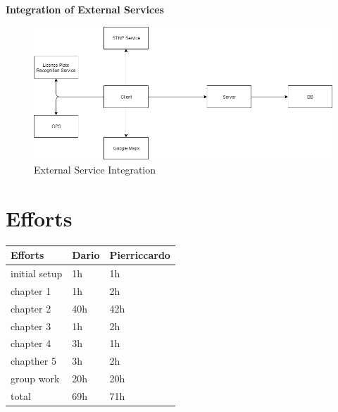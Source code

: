 \documentclass{article}
\begin{document}
\textbf{Integration of External Services}
\begin{figure}[H]
    \centering
    \includegraphics[scale=0.4]{img/integration/ExternalService_test.png}
    \caption{External Service Integration}
\end{figure}

\clearpage

\section{Efforts}

\begin{center}
\begin{tabular}{ | l | l | l |}
    \hline
    Efforts & Dario & Pierriccardo \\
    \hline
    initial setup & 1h & 1h \\
    \hline
    chapter 1 & 1h & 2h \\
    \hline
    chapter 2 & 40h & 42h \\
    \hline
    chapter 3 & 1h & 2h \\
    \hline
    chapter 4 & 3h & 1h \\
    \hline
    chapther 5 & 3h & 2h \\ 
    \hline
    group work & 20h & 20h \\
    \hline
    total & 69h & 71h \\
    \hline
\end{tabular}
\end{center}
\end{document}
